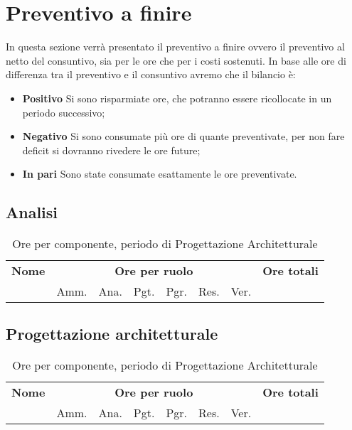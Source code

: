 \section{Preventivo a finire}
\label{consuntivo}

In questa sezione verrà presentato il preventivo a finire ovvero il preventivo al netto del consuntivo, sia per le ore che per i costi sostenuti. In base alle ore di differenza tra il preventivo e il consuntivo avremo che il bilancio è:
\begin{itemize}
\item \textbf{Positivo} Si sono risparmiate ore, che potranno essere ricollocate in un periodo successivo;
\item \textbf{Negativo} Si sono consumate più ore di quante preventivate, per non fare deficit si dovranno rivedere le ore future;
\item \textbf{In pari} Sono state consumate esattamente le ore preventivate.
\end{itemize}

\subsection{Analisi}
\begin{table}[H]
\begin{tabular}{lccccccc}
\toprule
    \textbf{Nome}  & \multicolumn{6}{c}{\textbf{Ore per ruolo}} & \textbf{Ore totali} \\
     & Amm. & Ana. & Pgt. & Pgr. & Res. & Ver. & \\
    \midrule
    
    	
    
    \bottomrule
\end{tabular}
\caption{Ore per componente, periodo di Progettazione Architetturale}
\end{table}

\subsection{Progettazione architetturale}

\begin{table}[H]
\begin{tabular}{lccccccc}
\toprule
    \textbf{Nome}  & \multicolumn{6}{c}{\textbf{Ore per ruolo}} & \textbf{Ore totali} \\
     & Amm. & Ana. & Pgt. & Pgr. & Res. & Ver. & \\
    \midrule
    
    	
    
    \bottomrule
\end{tabular}
\caption{Ore per componente, periodo di Progettazione Architetturale}
\end{table}

